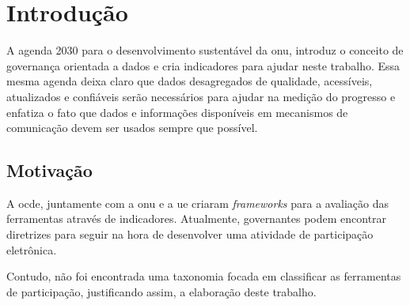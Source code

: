 \chapter[Introdução]{Introdução}
\label{cap:cap1}
\par
A agenda 2030 para o desenvolvimento sustentável da \acrfull{onu}, introduz o conceito de governança orientada a dados e cria indicadores para ajudar neste trabalho.
Essa mesma agenda deixa claro que dados desagregados de qualidade, acessíveis, atualizados e confiáveis serão necessários para ajudar na medição do progresso e enfatiza o fato 
que dados e informações disponíveis em mecanismos de comunicação devem ser usados sempre que possível.

\section{Motivação}
\label{sec:motivacao}
\par
A \acrfull{ocde}, juntamente com a \acrshort{onu} e a \acrfull{ue} criaram \textit{frameworks} para a avaliação das ferramentas através de indicadores. 
Atualmente, governantes podem encontrar diretrizes para seguir na hora de desenvolver uma atividade de participação eletrônica.

\par
Contudo, não foi encontrada uma taxonomia focada em classificar as ferramentas de participação, justificando assim, a elaboração deste trabalho.

